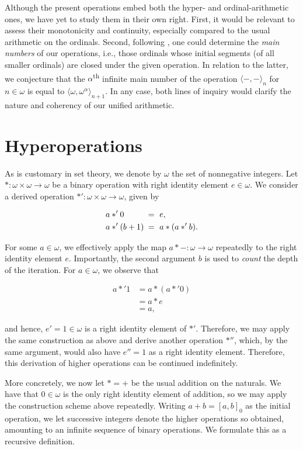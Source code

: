 \documentclass[12pt, a4paper]{article}
\theoremstyle{definition}
\theoremstyle{remark}
\newcommand{\op}[2]{\langle#1, #2\rangle}
\begin{document}
Although the present operations embed both the hyper- and ordinal-arithmetic ones, we have yet to study them in their own right. First, it would be relevant to assess their monotonicity and continuity, especially compared to the usual arithmetic on the ordinals. Second, following \cite{DoTa1969}, one could determine the \emph{main numbers} of our operations, i.e., those ordinals whose initial segments (of all smaller ordinals) are closed under the given operation. In relation to the latter, we conjecture that the $\alpha$\textsuperscript{th} infinite main number of the operation $\op--_n$ for $n \in \omega$ is equal to $\op\omega{\omega^\alpha}_{n+1}$. In any case, both lines of inquiry would clarify the nature and coherency of our unified arithmetic.

\section{Hyperoperations}

As is customary in set theory, we denote by $\omega$ the set of nonnegative integers. Let $* : \omega\times\omega \to \omega$ be a binary operation with right identity element $e \in \omega$. We consider a derived operation $*' : \omega\times\omega \to \omega$, given by

\begin{align*}
    a *' 0\phantom{(b+1)}\kern-.25em &=\ e,\\
    a *' (b+1)\phantom{0}\kern-.25em &=\ a * (a *' b).
\end{align*}

For some $a\in\omega$, we effectively apply the map $a * - : \omega \to \omega$ repeatedly to the right identity element $e$. Importantly, the second argument $b$ is used to \emph{count} the depth of the iteration. For $a\in\omega$, we observe that

\begin{align*}
    a *' 1 &= a * (a *' 0) \\
           &= a * e \\
           &= a,
\end{align*}

and hence, $e' = 1 \in \omega$ is a right identity element of $*'$. Therefore, we may apply the same construction as above and derive another operation $*''$, which, by the same argument, would also have $e'' = 1$ as a right identity element. Therefore, this derivation of higher operations can be continued indefinitely.

More concretely, we now let $* = +$ be the usual addition on the naturals. We have that $0\in\omega$ is the only right identity element of addition, so we may apply the construction scheme above repeatedly. Writing $a+b = [a,b]_0$ as the initial operation, we let successive integers denote the higher operations so obtained, amounting to an infinite sequence of binary operations. We formulate this as a recursive definition.
\end{document}
